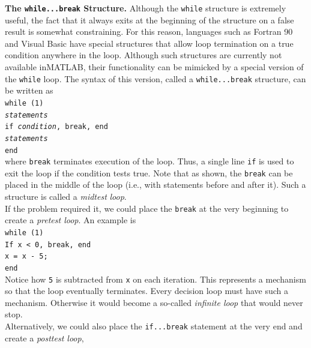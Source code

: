 \documentclass[../main.tex]{subfiles}
\begin{document}
\noindent\textbf{The \texttt{while...break} Structure.} Although the \texttt{while} structure is extremely useful, the
fact that it always exits at the beginning of the structure on a false result is somewhat
constraining. For this reason, languages such as Fortran 90 and Visual Basic have special
structures that allow loop termination on a true condition anywhere in the loop. Although
such structures are currently not available inMATLAB, their functionality can be mimicked
by a special version of the \texttt{while} loop. The syntax of this version, called a \texttt{while...break} structure, can be written as\\

\texttt{while (1)\\
\indent\hspace{2mm} \emph{statements}\\
\indent\hspace{2mm} if \emph{condition}, break, end\\
\indent\hspace{2mm} \emph{statements}\\
\indent end}\\

\noindent where \texttt{break} terminates execution of the loop. Thus, a single line \texttt{if} is used to exit the
loop if the condition tests true. Note that as shown, the \texttt{break} can be placed in the middle
of the loop (i.e., with statements before and after it). Such a structure is called a \emph{midtest}
\emph{loop}.\\
\indent If the problem required it, we could place the \texttt{break} at the very beginning to create a
\emph{pretest loop}. An example is\\

\texttt{while (1)\\
\indent\hspace{2mm} If x < 0, break, end\\
\indent\hspace{2mm} x = x - 5;\\
\indent end}\\

\noindent Notice how \texttt{5} is subtracted from \texttt{x} on each iteration. This represents a mechanism so that
the loop eventually terminates. Every decision loop must have such a mechanism. Otherwise
it would become a so-called \emph{infinite loop} that would never stop.\\
\indent Alternatively, we could also place the \texttt{if...break} statement at the very end and create
a \emph{posttest loop},\\
\end{document}
